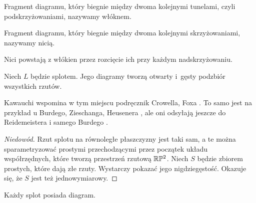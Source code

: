 \begin{definition}[włókno]
%
    Fragment diagramu, który biegnie między dwoma kolejnymi tunelami, czyli podskrzyżowaniami, nazywamy włóknem.
\end{definition}

\begin{definition}[nić]
%
    Fragment diagramu, który biegnie między dwoma kolejnymi skrzyżowaniami, nazywamy nicią.
\end{definition}

Nici powstają z włókien przez rozcięcie ich przy każdym nadskrzyżowaniu.

\begin{proposition}
    Niech $L$ będzie splotem.
    Jego diagramy tworzą otwarty i~gęsty podzbiór wszystkich rzutów.
\end{proposition}

Kawauchi \cite[s. 7]{kawauchi96} wspomina w tym miejscu podręcznik Crowella, Foxa \cite[s. 7]{crowell63}.
To samo jest na przykład u Burdego, Zieschanga, Heusenera \cite[s. 10]{burde14}, ale oni odsyłają jeszcze do Reidemeistera \cite{reidemeister27} i samego Burdego \cite{burde78}.

\begin{proof}[Niedowód]
    Rzut splotu na równoległe płaszczyzny jest taki sam, a te można sparametryzować prostymi przechodzącymi przez początek układu współrzędnych, które tworzą przestrzeń rzutową $\mathbb R \mathbb P^2$.
    Niech $S$ będzie zbiorem prostych, które dają złe rzuty.
    Wystarczy pokazać jego nigdziegęstość.
    Okazuje się, że $S$ jest też jednowymiarowy.
\end{proof}

\begin{corollary}
    Każdy splot posiada diagram.
\end{corollary}














